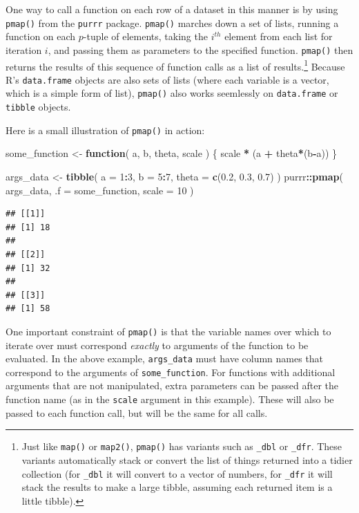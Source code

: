 \documentclass[
]{book}
\newenvironment{Shaded}{\begin{snugshade}}{\end{snugshade}}
\newcommand{\AttributeTok}[1]{\textcolor[rgb]{0.13,0.29,0.53}{#1}}
\newcommand{\ControlFlowTok}[1]{\textcolor[rgb]{0.13,0.29,0.53}{\textbf{#1}}}
\newcommand{\DecValTok}[1]{\textcolor[rgb]{0.00,0.00,0.81}{#1}}
\newcommand{\FloatTok}[1]{\textcolor[rgb]{0.00,0.00,0.81}{#1}}
\newcommand{\FunctionTok}[1]{\textcolor[rgb]{0.13,0.29,0.53}{\textbf{#1}}}
\newcommand{\NormalTok}[1]{#1}
\newcommand{\OtherTok}[1]{\textcolor[rgb]{0.56,0.35,0.01}{#1}}
\newcommand{\SpecialCharTok}[1]{\textcolor[rgb]{0.81,0.36,0.00}{\textbf{#1}}}
\begin{document}
One way to call a function on each row of a dataset in this manner is by using \texttt{pmap()} from the \texttt{purrr} package.
\texttt{pmap()} marches down a set of lists, running a function on each \(p\)-tuple of elements, taking the \(i^{th}\) element from each list for iteration \(i\), and passing them as parameters to the specified function.
\texttt{pmap()} then returns the results of this sequence of function calls as a list of results.\footnote{Just like \texttt{map()} or \texttt{map2()}, \texttt{pmap()} has variants such as \texttt{\_dbl} or \texttt{\_dfr}.
  These variants automatically stack or convert the list of things returned into a tidier collection (for \texttt{\_dbl} it will convert to a vector of numbers, for \texttt{\_dfr} it will stack the results to make a large tibble, assuming each returned item is a little tibble).}
Because R's \texttt{data.frame} objects are also sets of lists (where each variable is a vector, which is a simple form of list), \texttt{pmap()} also works seemlessly on \texttt{data.frame} or \texttt{tibble} objects.

Here is a small illustration of \texttt{pmap()} in action:

\begin{Shaded}
\begin{Highlighting}[]
\NormalTok{some\_function }\OtherTok{\textless{}{-}} \ControlFlowTok{function}\NormalTok{( a, b, theta, scale ) \{}
\NormalTok{    scale }\SpecialCharTok{*}\NormalTok{ (a }\SpecialCharTok{+}\NormalTok{ theta}\SpecialCharTok{*}\NormalTok{(b}\SpecialCharTok{{-}}\NormalTok{a))}
\NormalTok{\}}

\NormalTok{args\_data }\OtherTok{\textless{}{-}} \FunctionTok{tibble}\NormalTok{( }\AttributeTok{a =} \DecValTok{1}\SpecialCharTok{:}\DecValTok{3}\NormalTok{, }\AttributeTok{b =} \DecValTok{5}\SpecialCharTok{:}\DecValTok{7}\NormalTok{, }\AttributeTok{theta =} \FunctionTok{c}\NormalTok{(}\FloatTok{0.2}\NormalTok{, }\FloatTok{0.3}\NormalTok{, }\FloatTok{0.7}\NormalTok{) )}
\NormalTok{purrr}\SpecialCharTok{::}\FunctionTok{pmap}\NormalTok{( args\_data, }\AttributeTok{.f =}\NormalTok{ some\_function, }\AttributeTok{scale =} \DecValTok{10}\NormalTok{ )}
\end{Highlighting}
\end{Shaded}

\begin{verbatim}
## [[1]]
## [1] 18
## 
## [[2]]
## [1] 32
## 
## [[3]]
## [1] 58
\end{verbatim}

One important constraint of \texttt{pmap()} is that the variable names over which to iterate over must correspond \emph{exactly} to arguments of the function to be evaluated.
In the above example, \texttt{args\_data} must have column names that correspond to the arguments of \texttt{some\_function}.
For functions with additional arguments that are not manipulated, extra parameters can be passed after the function name (as in the \texttt{scale} argument in this example).
These will also be passed to each function call, but will be the same for all calls.
\end{document}
